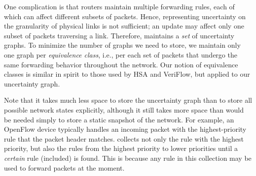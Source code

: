 One complication is that routers maintain multiple forwarding rules, each of which can affect
different subsets of packets. Hence, representing uncertainty on the granularity of
 physical links is not sufficient; an update may affect only one subset of packets traversing a link. Therefore, \name maintains a {\em set} of uncertainty graphs. To minimize the number of graphs we need to store,
we maintain only one graph per {\em equivalence class}, i.e., per each set of packets that undergo the same forwarding behavior 
throughout the network. Our notion of equivalence classes is similar in spirit to those used by HSA and VeriFlow, but applied to our uncertainty graph.


Note that it takes much less space to store the uncertainty graph than to store 
all possible network states explicitly, although it still takes more space than 
would be needed simply to store a static snapshot of the network.
For example, an OpenFlow device typically handles an incoming packet with the highest-priority rule that the packet header matches.
\name collects not only the rule with the highest priority, but also the rules from the highest priority to lower priorities until a \emph{certain} rule (included) is found. This is because any rule in this collection may be used to forward packets at the moment.
\fi

